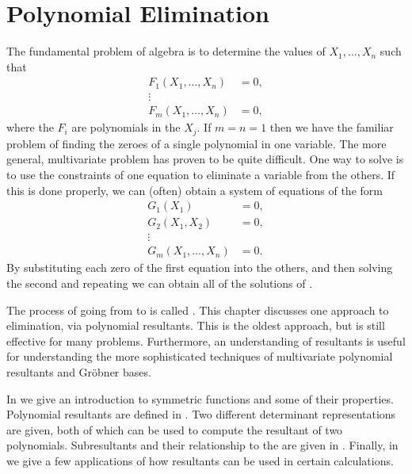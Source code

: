 \chapter{Polynomial Elimination}
\label{Grobner:Chap}

The fundamental problem of algebra is to determine the values of $X_1,
\ldots, X_n$ such that 
\begin{equation} \label{Elim:Eq}
\begin{aligned}
F_1(X_1, \ldots, X_n) & = 0, \\
\vdots \\
F_m(X_1, \ldots, X_n) & = 0,
\end{aligned}
\end{equation}
where the $F_i$ are polynomials in the $X_j$.  If $m = n = 1$ then
we have the familiar problem of finding the zeroes of a single polynomial
in one variable.  The more general, multivariate problem has proven to
be quite difficult.  One way to solve  is to
use the constraints of one equation to eliminate a variable from
the others.  If this is done properly, we can (often) obtain a system of
equations of the form
\begin{equation} \label{Elim:Eqb}
\begin{aligned}
G_1(X_1) & = 0, \\
G_2(X_1, X_2) & = 0, \\
\vdots \\
G_m(X_1, \ldots, X_n) & = 0.
\end{aligned}
\end{equation}
By substituting each zero of the first equation into the others, and
then solving the second and repeating we can obtain all of the
solutions of .

The process of going from  to  is
called .  This chapter discusses one approach to
elimination, via polynomial resultants.  This is the oldest
approach, but is still effective for many problems.  Furthermore, an
understanding of resultants is useful for understanding the more
sophisticated techniques of multivariate polynomial resultants and
Gr\"{o}bner bases.

In  we give an introduction to symmetric
functions and some of their properties.  Polynomial resultants are
defined in .  Two different determinant
representations are given, both of which can be used to compute the
resultant of two polynomials.  Subresultants and their relationship to
the
 are given in
.  Finally, in  we
give a few applications of how resultants can be used in certain
calculations.

